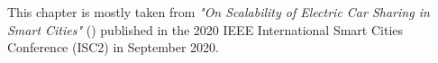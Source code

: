 %
%

This chapter is mostly taken from \textit{"On Scalability of Electric Car Sharing in Smart Cities"} (\cite{barulli2020scalability}) published in the 2020 IEEE International Smart Cities Conference (ISC2) in September 2020.
